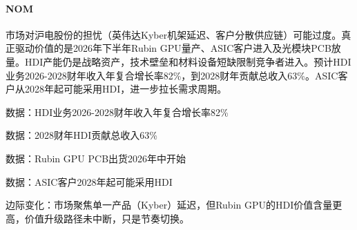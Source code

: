\documentclass[11pt]{ctexart}
\begin{document}
\paragraph{NOM} 市场对沪电股份的担忧（英伟达Kyber机架延迟、客户分散供应链）可能过度。真正驱动价值的是2026年下半年Rubin GPU量产、ASIC客户进入及光模块PCB放量。HDI产能仍是战略资产，技术壁垒和材料设备短缺限制竞争者进入。预计HDI业务2026-2028财年收入年复合增长率82\%，到2028财年贡献总收入63\%。ASIC客户从2028年起可能采用HDI，进一步拉长需求周期。
{\small\color{refgray}数据：HDI业务2026-2028财年收入年复合增长率82\%\par}
{\small\color{refgray}数据：2028财年HDI贡献总收入63\%\par}
{\small\color{refgray}数据：Rubin GPU PCB出货2026年中开始\par}
{\small\color{refgray}数据：ASIC客户2028年起可能采用HDI\par}
{\small\color{refgray}边际变化：市场聚焦单一产品（Kyber）延迟，但Rubin GPU的HDI价值含量更高，价值升级路径未中断，只是节奏切换。\par}
\end{document}
